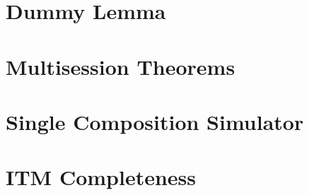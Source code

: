 \documentclass[conference]{IEEEtran}
\begin{document}
%

\section{Dummy Lemma} \label{app:dummy}


\section{Multisession Theorems} \label{app:ms}


\section{Single Composition Simulator} \label{app:simcomp}


%
%
%
%
%

\section{ITM Completeness} \label{app:itm}


\pagebreak
\end{document}
